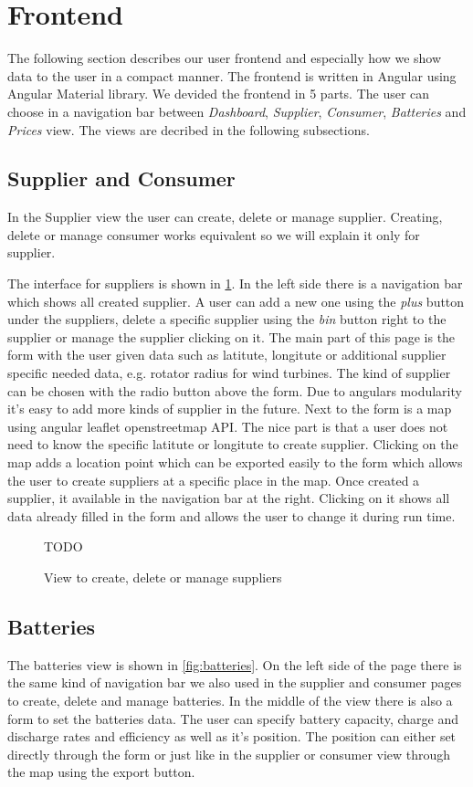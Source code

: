 \section{Frontend}\label{sec:frontend}
The following section describes our user frontend and especially how we show data to the user in a compact manner.
The frontend is written in Angular using Angular Material library.
We devided the frontend in 5 parts.
The user can choose in a navigation bar between \textit{Dashboard}, \textit{Supplier}, \textit{Consumer}, \textit{Batteries} and \textit{Prices} view.
The views are decribed in the following subsections.

\subsection{Supplier and Consumer}
In the Supplier view the user can create, delete or manage supplier.
Creating, delete or manage consumer works equivalent so we will explain it only for supplier.

The interface for suppliers is shown in \cref{fig:suppliers}.
In the left side there is a navigation bar which shows all created supplier.
A user can add a new one using the \textit{plus} button under the suppliers, delete a specific supplier using the \textit{bin} button right to the supplier or manage the supplier clicking on it.
The main part of this page is the form with the user given data such as latitute, longitute or additional supplier specific needed data, e.g. rotator radius for wind turbines.
The kind of supplier can be chosen with the radio button above the form.
Due to angulars modularity it's easy to add more kinds of supplier in the future.
Next to the form is a map using angular leaflet openstreetmap API.
The nice part is that a user does not need to know the specific latitute or longitute to create supplier.
Clicking on the map adds a location point which can be exported easily to the form which allows the user to create suppliers at a specific place in the map.
Once created a supplier, it available in the navigation bar at the right.
Clicking on it shows all data already filled in the form and allows the user to change it during run time.


\begin{figure}[!h]
    \centering
    TODO%
    \caption{View to create, delete or manage suppliers}
    \label{fig:suppliers}
\end{figure}

\subsection{Batteries}
The batteries view is shown in \cref{fig:batteries}.
On the left side of the page there is the same kind of navigation bar we also used in the supplier and consumer pages to create, delete and manage batteries.
In the middle of the view there is also a form to set the batteries data.
The user can specify battery capacity, charge and discharge rates and efficiency as well as it's position.
The position can either set directly through the form or just like in the supplier or consumer view through the map using the export button.

